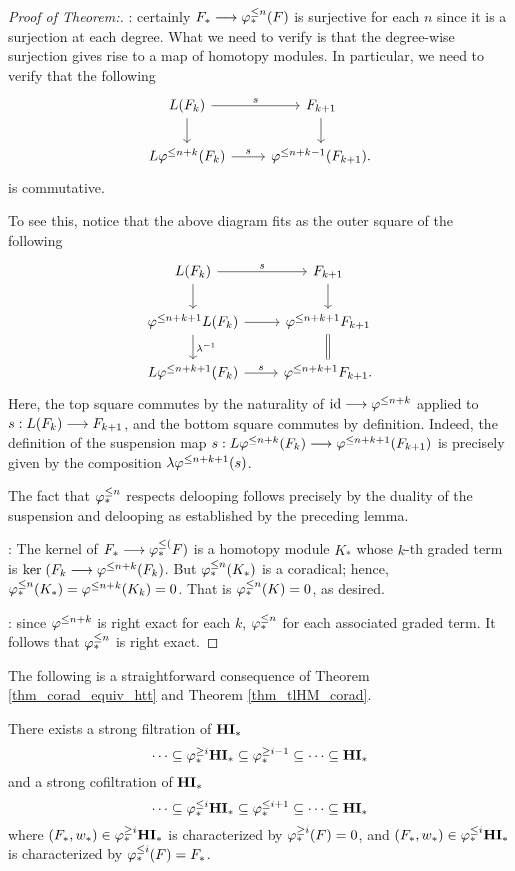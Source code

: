 \begin{proof}[Proof of Theorem:]

 : certainly $F_* \longrightarrow 
\varphi^{\leq n}_{*}(F)$ is surjective for each $n$ since it is a surjection 
at each degree. What we need to verify is that the degree-wise 
surjection gives rise to a map of homotopy modules. In particular, 
we need to verify that the following
\[
\begin{tikzcd}
L(F_k) \arrow{r}{\susp} \arrow{d} &
F_{k + 1} \arrow{d} \\
L \tlHI{n + k}(F_k) \arrow{r}{\susp} &
\tlHI{n + k - 1}(F_{k + 1}).
\end{tikzcd}
\]
is commutative.

To see this, notice that the above diagram fits as the outer 
square of the following
\[
\begin{tikzcd}
L(F_k) \arrow{r}{\susp} \arrow{d} &
F_{k + 1} \arrow{d} \\
\tlHI{n + k + 1} L(F_k) \arrow{r} \arrow{d}{\lambda^{-1}} &
\tlHI{n + k + 1} F_{k + 1} \arrow[equals]{d} \\
L \tlHI{n + k + 1}(F_k) \arrow{r}{\susp} &
\tlHI{n + k + 1} F_{k + 1}.
\end{tikzcd}
\]
Here, the top square commutes by the naturality of $\mathrm{id} \longrightarrow 
\varphi^{\leq n + k}$ applied to $s: L(F_k) \longrightarrow F_{k + 1}$, and the 
bottom square commutes by definition. Indeed, the definition of 
the suspension map $s: L \varphi^{\leq n + k}(F_k) \longrightarrow 
\varphi^{\leq n + k + 1}(F_{k + 1})$ is precisely given by the composition
$\lambda \varphi^{\leq n + k + 1}(s)$.

The fact that $\varphi^{\leq n}_{*}$ respects delooping follows precisely by
the duality of the suspension and delooping as established by the
preceding lemma.

 : The kernel of $F_* \longrightarrow 
\varphi^{\leq (}_{*}F)$ is a homotopy module $K_*$ whose $k$-th graded term is 
$\mathrm{ker}\; (F_k \longrightarrow \varphi^{\leq n + k}(F_k)$. But $\varphi^{\leq n}_{*}(K_*)$ is a 
coradical; hence, $\varphi^{\leq n}_{*}(K_*) = \varphi^{\leq n + k}(K_k) = 0$. That
is $\varphi^{\leq n}_{*}(K) = 0$, as desired.

 : since $\varphi^{\leq n + k}$ is 
right exact for each $k$, $\varphi^{\leq n}_{*}$ for each associated graded 
term. It follows that $\varphi^{\leq n}_{*}$ is right exact.
\end{proof}

The following is a straightforward consequence of Theorem 
\ref{thm_corad_equiv_htt} and Theorem \ref{thm_tlHM_corad}.

\begin{cor}
There exists a strong filtration of $\mathbf{HI}_*$
\[
\cdots \subseteq \varphi^{\geq i}_{*}\mathbf{HI}_* \subseteq \varphi^{\geq i - 1}_{*} \subseteq 
   \cdots \subseteq \mathbf{HI}_*
\]
and a strong cofiltration of $\mathbf{HI}_*$
\[
\cdots \subseteq \varphi^{\leq i}_{*}\mathbf{HI}_* \subseteq \varphi^{\leq i + 1}_{*} \subseteq 
   \cdots \subseteq \mathbf{HI}_*
\]
where $(F_*, w_*) \in \varphi^{\geq i}_{*}\mathbf{HI}_*$ is characterized by
$\varphi^{\geq i}_{*}(F) = 0$, and $(F_*, w_*) \in \varphi^{\leq i}_{*}\mathbf{HI}_*$ is
characterized by $\varphi^{\leq i}_{*}(F) = F_*$.
\end{cor}
\noproof

